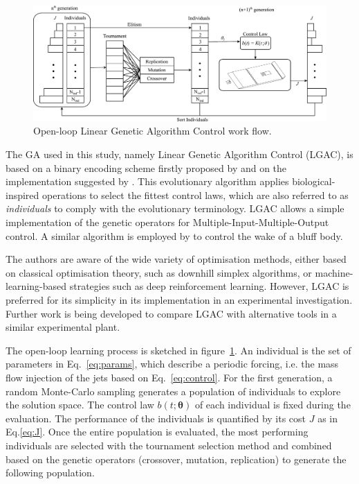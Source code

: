 \begin{figure}
    \centering
    \includegraphics[width = 0.99\linewidth]{figures/F5.pdf}
    \caption{Open-loop Linear Genetic Algorithm Control work flow.}
    \label{fig:flowchart}
\end{figure}

The GA used in this study, namely Linear Genetic Algorithm Control (LGAC), is based on a binary encoding scheme firstly proposed by \citet{holland1992adaptation} and on the implementation suggested by \citet{Wahde2008book}. This evolutionary algorithm applies biological-inspired operations to select the fittest control laws, which are also referred to as \textit{individuals} to comply with the evolutionary terminology. LGAC allows a simple implementation of the genetic operators for Multiple-Input-Multiple-Output control. A similar algorithm is employed by \citet{minelli2020lgac} to control the wake of a bluff body.

The authors are aware of the wide variety of optimisation methods, either based on classical optimisation theory, such as downhill simplex algorithms, or machine-learning-based strategies such as deep reinforcement learning. However, LGAC is preferred for its simplicity in its implementation in an experimental investigation. Further work is being developed to compare LGAC with alternative tools in a similar experimental plant.

The open-loop learning process is sketched in figure~\ref{fig:flowchart}. An individual is the set of parameters in Eq.~\eqref{eq:params}, which describe a periodic forcing, i.e. the mass flow injection of the jets based on Eq.~\eqref{eq:control}. For the first generation, a random Monte-Carlo sampling generates a population of individuals to explore the solution space. The control law $b(t;\bm{\theta})$ of each individual is fixed during the evaluation. The performance of the individuals is quantified by its cost $J$ as in Eq.\eqref{eq:J}. Once the entire population is evaluated, the most performing individuals are selected with the tournament selection method and combined based on the genetic operators (crossover, mutation, replication) to generate the following population.

